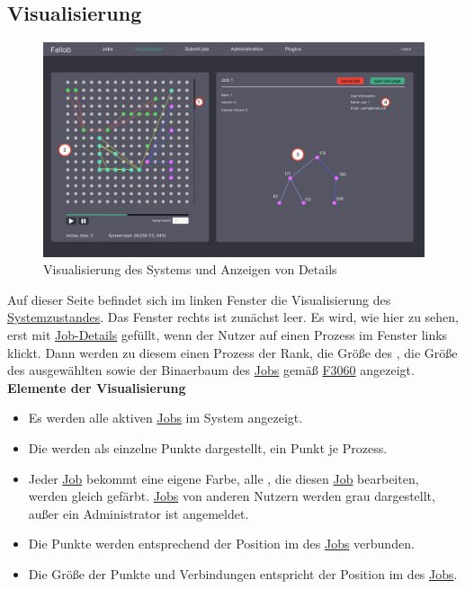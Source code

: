 \newpage
\subsection{Visualisierung}
\label{pages:visualization}
\begin{figure}[H]
    \centering
    \includegraphics[width=\textwidth]{images-interface/v6_interface/visualization_page_6.pdf}
    \caption{Visualisierung des Systems und Anzeigen von Details}
    \label{fig:visualization-page}
\end{figure}
Auf dieser Seite befindet sich im linken Fenster die Visualisierung des \hyperref[B:Systemzustand]{Systemzustandes}. Das Fenster rechts ist zunächst leer. Es wird, wie hier zu sehen, erst mit \hyperref[B:Job-Details]{Job-Details} gefüllt, wenn der \gls{Nutzer} auf einen Prozess im Fenster links klickt. Dann werden zu diesem einen Prozess der Rank, die Größe des , die Größe des ausgewählten  sowie der \gls{Binaerbaum} des \hyperref[B:Jobs]{Jobs} gemäß \hyperref[FA:Visualisierung:Anzeigen des Binaerbaumes für einen Job]{F3060} angezeigt.\\

\textbf{Elemente der Visualisierung}

\label{vis:appearance}
\begin{itemize}[noitemsep]
        \item Es werden alle aktiven \hyperref[B:Jobs]{Jobs} im System angezeigt.
        \item Die  werden als einzelne Punkte dargestellt, ein Punkt je \gls{Prozess}.
        \item Jeder \hyperref[B:Jobs]{Job} bekommt eine eigene Farbe, alle , die diesen \hyperref[B:Jobs]{Job} bearbeiten, werden gleich gefärbt.
        \hyperref[B:Jobs]{Jobs} von anderen Nutzern werden grau dargestellt, außer ein \gls{Administrator} ist angemeldet.
        \item Die Punkte werden entsprechend der Position im  des \hyperref[B:Jobs]{Jobs} verbunden.
        \item Die Größe der Punkte und Verbindungen entspricht der Position im  des  \hyperref[B:Jobs]{Jobs}.
\end{itemize}

